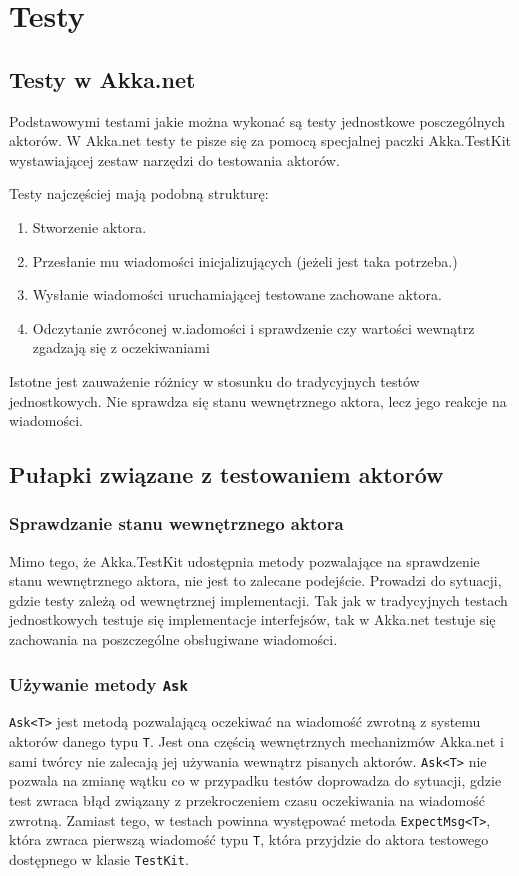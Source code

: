 \chapter{Testy}
\section{Testy w Akka.net}
Podstawowymi testami jakie można wykonać są testy jednostkowe posczególnych aktorów.
W Akka.net testy te pisze się za pomocą specjalnej paczki Akka.TestKit wystawiającej zestaw narzędzi do testowania aktorów.

Testy najczęściej mają podobną strukturę:
\begin{enumerate}
    \item Stworzenie aktora.
    \item Przesłanie mu wiadomości inicjalizujących (jeżeli jest taka potrzeba.)
    \item Wysłanie wiadomości uruchamiającej testowane zachowane aktora.
    \item Odczytanie zwróconej w.iadomości i sprawdzenie czy wartości wewnątrz zgadzają się z oczekiwaniami
\end{enumerate}
Istotne jest zauważenie różnicy w stosunku do tradycyjnych testów jednostkowych. Nie sprawdza się stanu wewnętrznego aktora, lecz jego reakcje na wiadomości.

\section{Pułapki związane z testowaniem aktorów}
\subsection{Sprawdzanie stanu wewnętrznego aktora}
Mimo tego, że Akka.TestKit udostępnia metody pozwalające na sprawdzenie stanu wewnętrznego aktora, nie jest to zalecane podejście. 
Prowadzi do sytuacji, gdzie testy zależą od wewnętrznej implementacji. 
Tak jak w tradycyjnych testach jednostkowych testuje się implementacje interfejsów, tak w Akka.net testuje się zachowania na poszczególne obsługiwane wiadomości.

\subsection{Używanie metody \lstinline{Ask}}
\lstinline{Ask<T>} jest metodą pozwalającą oczekiwać na wiadomość zwrotną z systemu aktorów danego typu \lstinline{T}.
Jest ona częścią wewnętrznych mechanizmów Akka.net i sami twórcy nie zalecają jej używania wewnątrz pisanych aktorów. 
\lstinline{Ask<T>} nie pozwala na zmianę wątku co w przypadku testów doprowadza do sytuacji, gdzie test zwraca błąd związany z przekroczeniem czasu oczekiwania na wiadomość zwrotną. Zamiast tego, w testach powinna występować metoda \lstinline{ExpectMsg<T>}, która zwraca pierwszą wiadomość typu \lstinline{T}, która przyjdzie do aktora testowego dostępnego w klasie \lstinline{TestKit}.  

